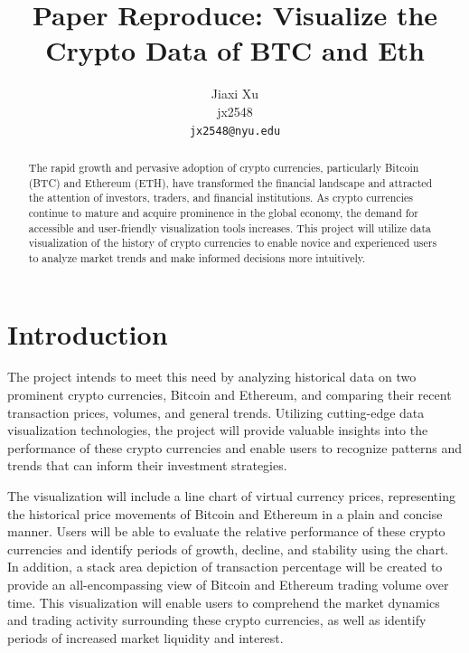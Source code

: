 \documentclass[10pt,twocolumn,a4paper]{article}
\begin{document}
\title{Paper Reproduce: Visualize the Crypto Data of BTC and Eth}
\author{Jiaxi Xu\\jx2548\\{\tt\small jx2548@nyu.edu}}
\maketitle



\begin{abstract}

The rapid growth and pervasive adoption of crypto currencies, particularly Bitcoin (BTC) and Ethereum (ETH), have transformed the financial landscape and attracted the attention of investors, traders, and financial institutions. As crypto currencies continue to mature and acquire prominence in the global economy, the demand for accessible and user-friendly visualization tools increases. This project will utilize data visualization of the history of crypto currencies to enable novice and experienced users to analyze market trends and make informed decisions more intuitively.

\end{abstract}

\section{Introduction}
\label{sec:introduction}


The project intends to meet this need by analyzing historical data on two prominent crypto currencies, Bitcoin and Ethereum, and comparing their recent transaction prices, volumes, and general trends\cite{nils_2022}. Utilizing cutting-edge data visualization technologies, the project will provide valuable insights into the performance of these crypto currencies and enable users to recognize patterns and trends that can inform their investment strategies.

The visualization will include a line chart of virtual currency prices, representing the historical price movements of Bitcoin and Ethereum in a plain and concise manner\cite{orac_2021}. Users will be able to evaluate the relative performance of these crypto currencies and identify periods of growth, decline, and stability using the chart. In addition, a stack area depiction of transaction percentage will be created to provide an all-encompassing view of Bitcoin and Ethereum trading volume over time. This visualization will enable users to comprehend the market dynamics and trading activity surrounding these crypto currencies, as well as identify periods of increased market liquidity and interest.
\end{document}
